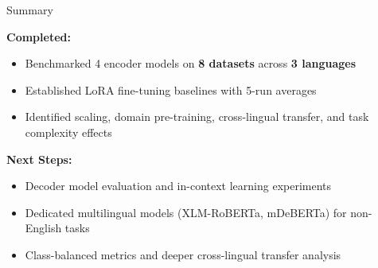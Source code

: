 \documentclass[aspectratio=169]{beamer}
\begin{document}
\begin{frame}{Summary}
  \begin{center}
  \end{center}

  \vspace{0.2cm}
  \textbf{Completed:}
  \begin{itemize}
    \item[\checkmark] Benchmarked 4 encoder models on \textbf{8 datasets} across \textbf{3 languages}
    \item[\checkmark] Established LoRA fine-tuning baselines with 5-run averages
    \item[\checkmark] Identified scaling, domain pre-training, cross-lingual transfer, and task complexity effects
  \end{itemize}

  \vspace{0.2cm}
  \textbf{Next Steps:}
  \begin{itemize}
    \item[$\rightarrow$] Decoder model evaluation and in-context learning experiments
    \item[$\rightarrow$] Dedicated multilingual models (XLM-RoBERTa, mDeBERTa) for non-English tasks
    \item[$\rightarrow$] Class-balanced metrics and deeper cross-lingual transfer analysis
  \end{itemize}
\end{frame}
\end{document}
